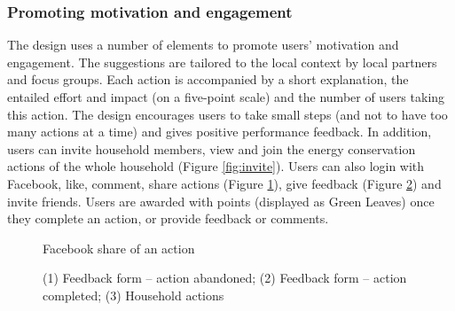 \subsubsection{Promoting motivation and engagement} 
The design uses a number of elements to promote users' motivation and engagement. 
The suggestions are tailored to the local context by local partners and focus groups. 
Each action is accompanied by a short explanation, the entailed effort and impact (on a five-point scale) and the number of users taking this action. 
The design encourages users to take small steps (and not to have too many actions at a time) and gives positive performance feedback. 
In addition, users can invite household members, view and join the energy conservation actions of the whole household (Figure \ref{fig:invite}).
Users can also login with Facebook, like, comment, share actions (Figure \ref{fig:share}), give feedback (Figure \ref{fig:form}) and invite friends. Users are awarded with points  (displayed as Green Leaves) once they complete an action, or provide feedback or comments. 




\begin{figure}
\centering
{}
\caption{Facebook share of an action}
\label{fig:share}
\end{figure}

\begin{figure}[t!]
      \begin{center}
        \begin{minipage}[t!]{0.33\linewidth}
        \end{minipage}
        \begin{minipage}[t!]{0.31\linewidth}
                \end{minipage}
        \begin{minipage}[t!]{0.33\linewidth}    
        \end{minipage}
      \end{center}
      \caption{(1) Feedback form -- action abandoned; (2) Feedback form -- action completed; (3) Household actions}\label{fig:form}
\end{figure}

